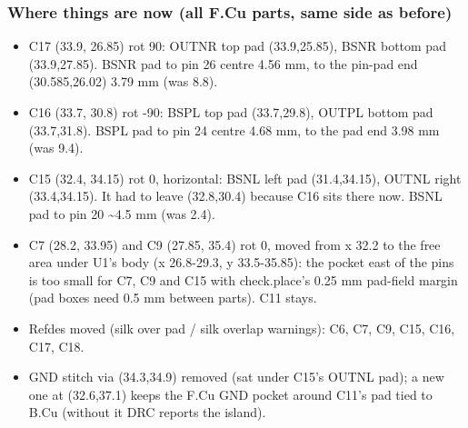 \documentclass[11pt]{article}
\begin{document}
\subsubsection*{Where things are now (all F.Cu parts, same side as before)}
\begin{itemize}
\item C17 (33.9, 26.85) rot 90: OUTNR top pad (33.9,25.85), BSNR bottom pad (33.9,27.85).
BSNR pad to pin 26 centre 4.56 mm, to the pin-pad end (30.585,26.02) 3.79 mm (was 8.8).
\item C16 (33.7, 30.8) rot -90: BSPL top pad (33.7,29.8), OUTPL bottom pad (33.7,31.8).
BSPL pad to pin 24 centre 4.68 mm, to the pad end 3.98 mm (was 9.4).
\item C15 (32.4, 34.15) rot 0, horizontal: BSNL left pad (31.4,34.15), OUTNL right (33.4,34.15).
It had to leave (32.8,30.4) because C16 sits there now. BSNL pad to pin 20 \textasciitilde{}4.5 mm (was 2.4).
\item C7 (28.2, 33.95) and C9 (27.85, 35.4) rot 0, moved from x 32.2 to the free area under U1's
body (x 26.8-29.3, y 33.5-35.85): the pocket east of the pins is too small for C7, C9 and C15
with check.place's 0.25 mm pad-field margin (pad boxes need 0.5 mm between parts). C11 stays.
\item Refdes moved (silk over pad / silk overlap warnings): C6, C7, C9, C15, C16, C17, C18.
\item GND stitch via (34.3,34.9) removed (sat under C15's OUTNL pad); a new one at (32.6,37.1)
keeps the F.Cu GND pocket around C11's pad tied to B.Cu (without it DRC reports the island).
\end{itemize}
\end{document}
